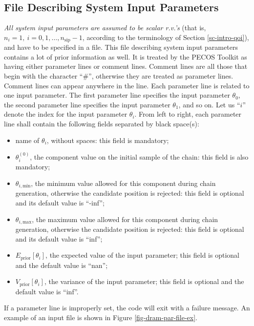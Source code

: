 \subsection{File Describing System Input Parameters}\label{subsc-gmc-seven-steps-sys-input-params}

{\it All system input parameters are assumed to be scalar r.v.'s} (that is, $n_i=1,~i=0,1,\ldots,n_{\text{sip}}-1$, according to the terminology of Section \ref{sc-intro-qoi}), and
have to be specified in a file.
This file describing system input parameters contains a lot of prior information as well.
It is treated by the PECOS Toolkit as having either parameter lines or comment lines.
Comment lines are all those that begin with the character ``\#'', otherwise they are treated as parameter lines.
Comment lines can appear anywhere in the line.
Each parameter line is related to one input parameter.
The first parameter line specifies the input parameter $\theta_0$,
the second parameter line specifies the input parameter $\theta_1$,
and so on.
Let us ``$i$'' denote the index for the input parameter $\theta_i$.
From left to right, each parameter line shall contain the following fields separated by black space(s):
\begin{itemize}
\item name of $\theta_i$, without spaces: this field is mandatory;
\item $\theta_i^{(0)}$, the component value on the initial sample of the chain: this field is also mandatory;
\item $\theta_{i,\text{min}}$, the minimum value allowed for this component during chain generation, otherwise the candidate position is rejected: this field is optional and its default value is ``-inf'';
\item $\theta_{i,\text{max}}$, the maximum value allowed for this component during chain generation, otherwise the candidate position is rejected: this field is optional and its default value is ``inf'';
\item $E_{\text{prior}}[\theta_i]$, the expected value of the input parameter; this field is optional and the default value is ``nan'';
\item $V_{\text{prior}}[\theta_i]$, the variance of the input parameter; this field is optional and the default value is ``inf''.
\end{itemize}
If a parameter line is improperly set, the code will exit with a failure message.
An example of an input file is shown in Figure \ref{fig-dram-par-file-ex}.

